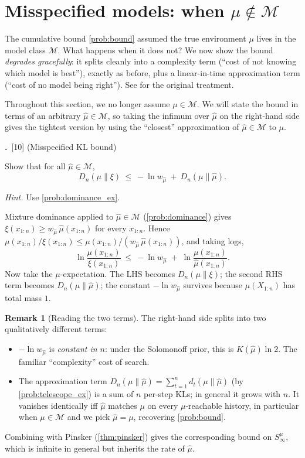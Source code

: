 \documentclass[fontsize=11pt, parskip=half]{scrartcl}
\theoremstyle{definition}
\newtheorem{remark}[theorem]{Remark}
\newenvironment{solution}{%
    \begin{tcolorbox}[colback=black!5!white, colframe=black!50!white,
      title={\textbf{Solution}}, fonttitle=\normalfont, breakable]
  }{\end{tcolorbox}}
\newenvironment{solution}{\expandafter\comment}{\expandafter\endcomment}
\newcommand{\mysubsection}[2]{\par\medskip\noindent\refstepcounter{subsection}\textbf{\thesubsection.}~#2\par\smallskip}
\newcommand{\Mc}{\mathcal{M}}
\begin{document}
\section{Misspecified models: when $\mu \notin \Mc$}\label{prob:misspec}

The cumulative bound \cref{prob:bound} assumed the true environment $\mu$ lives
in the model class $\Mc$. What happens when it does not? We now show the
bound \emph{degrades gracefully}: it splits cleanly into a complexity term
(``cost of not knowing which model is best''), exactly as before, plus a
linear-in-time approximation term (``cost of no model being right''). See \cite[\S3.2.8]{Hutter:04uaibook} for the original treatment.

Throughout this section, we no longer assume $\mu \in \Mc$. 
We will state the bound in terms of an arbitrary
$\hat\mu \in \Mc$, so taking the infimum over $\hat\mu$ on the
right-hand side gives the tightest version by using the ``closest''
approximation of $\hat{\mu} \in \Mc$ to $\mu$.
\mysubsection{1}{[10] (Misspecified KL bound)\label{prob:misspec_ex}}

Show that for all $\hat\mu \in \Mc$,
\[
  D_n(\mu \parallel \xi) ~\leq~ -\ln w_{\hat\mu} ~+~ D_n(\mu \parallel \hat\mu).
\]

\textit{Hint.} Use \cref{prob:dominance_ex}.

\begin{solution}
Mixture dominance applied to $\hat\mu \in \Mc$ (\cref{prob:dominance}) gives
$\xi(x_{1:n}) \geq w_{\hat\mu}\, \hat\mu(x_{1:n})$ for every $x_{1:n}$. Hence
$\mu(x_{1:n}) / \xi(x_{1:n}) \leq \mu(x_{1:n}) / (w_{\hat\mu}\, \hat\mu(x_{1:n}))$, and taking logs,
\[
  \ln \frac{\mu(x_{1:n})}{\xi(x_{1:n})}
  ~\leq~ -\ln w_{\hat\mu} \;+\; \ln \frac{\mu(x_{1:n})}{\hat\mu(x_{1:n})}.
\]
Now take the $\mu$-expectation. The LHS becomes $D_n(\mu \parallel \xi)$; the second RHS term becomes $D_n(\mu \parallel \hat\mu)$; the constant $-\ln w_{\hat\mu}$ survives because $\mu(X_{1:n})$ has total mass $1$. \qedhere
\end{solution}

\begin{remark}[Reading the two terms]
The right-hand side splits into two qualitatively different terms:
\begin{itemize}\itemsep=2pt
\item $-\ln w_{\hat\mu}$ is \emph{constant in $n$}: under the Solomonoff
prior, this is $K(\hat\mu)\ln 2$. The familiar ``complexity'' cost of search.
\item The approximation term $D_n(\mu \parallel \hat\mu) = \sum_{t=1}^n d_t(\mu \parallel \hat\mu)$ (by \cref{prob:telescope_ex}) is a sum of $n$ per-step KLs; in general it grows with $n$. It vanishes identically iff $\hat\mu$ matches $\mu$ on every $\mu$-reachable history, in particular when $\mu \in \Mc$ and we pick $\hat\mu = \mu$, recovering \cref{prob:bound}.
\end{itemize}
Combining with Pinsker (\cref{thm:pinsker}) gives the corresponding bound on
$S^\mu_\infty$, which is infinite in general but inherits the rate of $\hat\mu$.
\end{remark}
\end{document}
